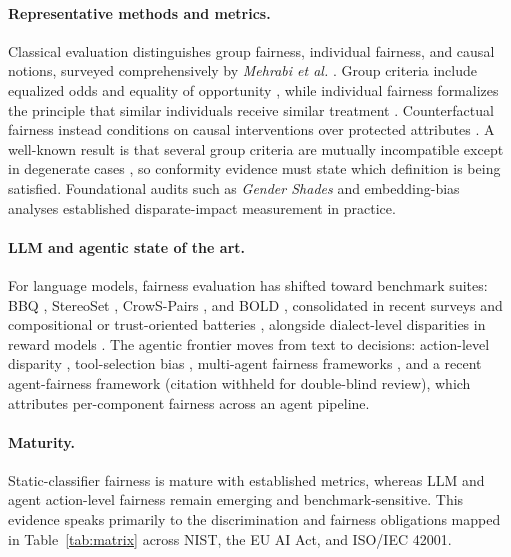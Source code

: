 \paragraph{Representative methods and metrics.} Classical evaluation distinguishes group fairness, individual fairness, and causal notions, surveyed comprehensively by \textit{Mehrabi et al.} \cite{mehrabi2021survey}. Group criteria include equalized odds and equality of opportunity \cite{hardt2016equality}, while individual fairness formalizes the principle that similar individuals receive similar treatment \cite{dwork2012fairness}. Counterfactual fairness instead conditions on causal interventions over protected attributes \cite{kusner2017counterfactual}. A well-known result is that several group criteria are mutually incompatible except in degenerate cases \cite{kleinberg2017inherent,chouldechova2017fair}, so conformity evidence must state which definition is being satisfied. Foundational audits such as \textit{Gender Shades} \cite{buolamwini2018gender} and embedding-bias analyses \cite{caliskan2017semantics,bolukbasi2016man} established disparate-impact measurement in practice.

\paragraph{LLM and agentic state of the art.} For language models, fairness evaluation has shifted toward benchmark suites: BBQ \cite{parrish2022bbq}, StereoSet \cite{nadeem2021stereoset}, CrowS-Pairs \cite{nangia2020crows}, and BOLD \cite{dhamala2021bold}, consolidated in recent surveys \cite{gallegos2024bias,chu2024fairness,navigli2023biases} and compositional or trust-oriented batteries \cite{wang2024ceb,huang2024trustllm,wang2023decodingtrust}, alongside dialect-level disparities in reward models \cite{mire2025rejected}. The agentic frontier moves from text to decisions: action-level disparity \cite{li2025actions}, tool-selection bias \cite{blankenstein2025biasbusters}, multi-agent fairness frameworks \cite{ranjan2025fairness}, and a recent agent-fairness framework (citation withheld for double-blind review), which attributes per-component fairness across an agent pipeline.

\paragraph{Maturity.} Static-classifier fairness is mature with established metrics, whereas LLM and agent action-level fairness remain emerging and benchmark-sensitive. This evidence speaks primarily to the discrimination and fairness obligations mapped in Table~\ref{tab:matrix} across NIST, the EU AI Act, and ISO/IEC 42001.

